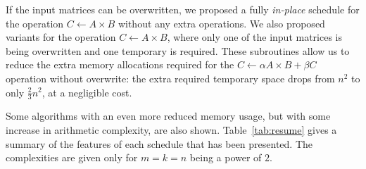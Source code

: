 \documentclass{article}
\begin{document}
If the input matrices can be overwritten, we proposed a fully \textit{in-place}
schedule for the operation $C\leftarrow A\times B$ without any extra operations.
We also proposed variants for the operation $C\leftarrow
A\times B$, where only
one of the input matrices is being overwritten and one temporary is
required.
These subroutines allow us to reduce the extra memory allocations
required for the $C\leftarrow \alpha
A\times B +\beta C$ operation without overwrite: the extra required
temporary space drops from $n^2$ to only $\frac{2}{3} n^2$, at a negligible cost.

Some algorithms with an even more reduced memory usage, but with some increase in arithmetic
complexity, are also shown.
Table~\ref{tab:resume} gives a summary of the features of each schedule that has been
presented.
The complexities are given only for $m=k=n$ being a power of $2$.
\end{document}
